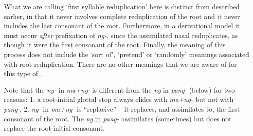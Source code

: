 What we are calling ‘first syllable reduplication’ here is distinct from  described earlier, in that it never involves complete reduplication of the root and it never includes the last consonant of the root. Furthermore, in a derivational model it must occur \textit{after} prefixation of \textit{ng-}, since the assimilated nasal reduplicates, as though it were the first consonant of the root. Finally, the meaning of this process does not include the ‘sort of’, ‘pretend’ or ‘randomly’ meanings associated with root reduplication. There are no other meanings that we are aware of for this type of .

Note that the \textit{ng-} in \textit{ma+ng}- is different from the \textit{ng} in \textit{pang}{}- (below) for two reasons: 1. a root-initial glottal stop always elides with \textit{ma+ng-} but not with \textit{pang}{}-. 2. \textit{ng}- in \textit{ma+ng-} is “replacive” – it replaces, and assimilates to, the first consonant of the root. The \textit{ng} in \textit{pang-} assimilates (sometimes) but does not replace the root-initial consonant.


